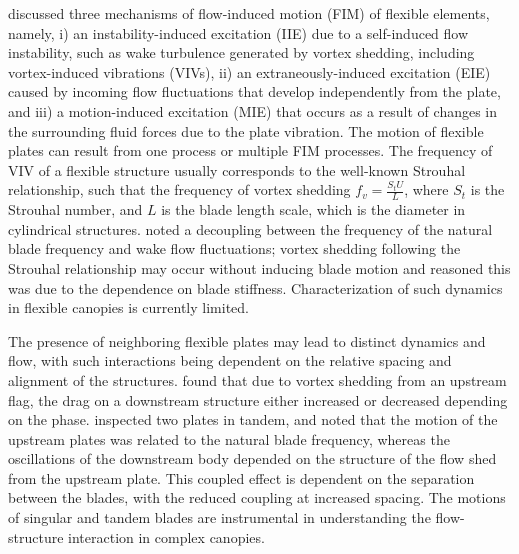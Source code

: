 \documentclass[lineno,authoryear]{FLO_v1}%
\theoremstyle{definition}
\begin{document}
\citet{naudascher2017flow} discussed three mechanisms of flow-induced motion (FIM) of flexible elements, namely, i) an instability-induced excitation (IIE) due to a self-induced flow instability, such as wake turbulence generated by vortex shedding, including vortex-induced vibrations (VIVs), ii) an extraneously-induced excitation (EIE) caused by incoming flow fluctuations that develop independently from the plate, and iii) a motion-induced excitation (MIE) that occurs as a result of changes in the surrounding fluid forces due to the plate vibration. The motion of flexible plates can result from one process or multiple FIM processes. The frequency of VIV of a flexible structure usually corresponds to the well-known Strouhal relationship, such that the frequency of vortex shedding  $f_v= \frac{S_tU}{L}$, where  $S_t$  is the Strouhal number, and $L$ is the blade length scale, which is the diameter in cylindrical structures. \citet{jin2018instability} noted a decoupling between the frequency of the natural blade frequency and wake flow fluctuations; vortex shedding following the Strouhal relationship may occur without inducing blade motion and reasoned this was due to the dependence on blade stiffness. Characterization of such dynamics in flexible canopies is currently limited.

The presence of neighboring flexible plates may lead to distinct dynamics and flow, with such interactions being dependent on the relative spacing and alignment of the structures. \citet{kim2010constructive} found that due to vortex shedding from an upstream flag, the drag on a downstream structure either increased or decreased depending on the phase. \citet{jin2018couple} inspected two plates in tandem, and noted that the motion of the upstream plates was related to the natural blade frequency, whereas the oscillations of the downstream body depended on the structure of the flow shed from the upstream plate. This coupled effect is dependent on the separation between the blades, with the reduced coupling at increased spacing. The motions of singular and tandem blades are instrumental in understanding the flow-structure interaction in complex canopies.
\end{document}
